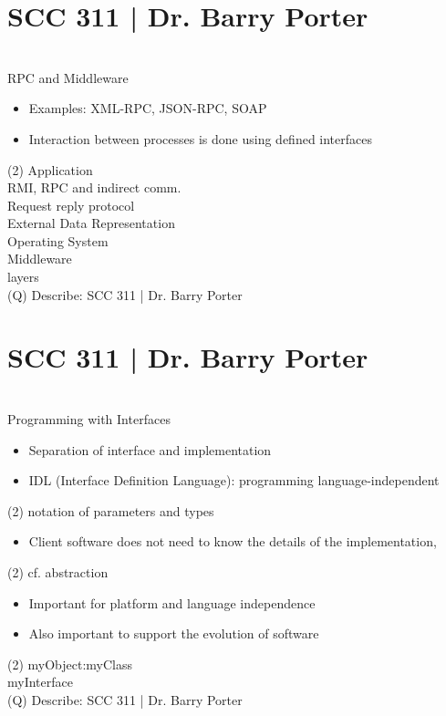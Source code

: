 \documentclass[12pt]{article}
\begin{document}
\section{SCC 311 | Dr. Barry Porter}
\\
RPC and Middleware\\
\begin{itemize}
  \item Examples: XML-RPC, JSON-RPC, SOAP
  \item Interaction between processes is done using defined interfaces
\end{itemize}(2)
Application\\
RMI, RPC and indirect comm.\\
Request reply protocol\\
External Data Representation\\
Operating System\\
Middleware \\
layers\\
\clearpage
(Q)
Describe: SCC 311 | Dr. Barry Porter
\clearpage
\section{SCC 311 | Dr. Barry Porter}
\\
Programming with Interfaces\\
\begin{itemize}
  \item Separation of interface and implementation
  \item IDL (Interface Definition Language): programming language-independent 
\end{itemize}(2)
notation of parameters and types\\
\begin{itemize}
  \item Client software does not need to know the details of the implementation, 
\end{itemize}(2)
cf. abstraction\\
\begin{itemize}
  \item Important for platform and language independence
  \item Also important to support the evolution of software
\end{itemize}(2)
myObject:myClass\\
myInterface\\
\clearpage
(Q)
Describe: SCC 311 | Dr. Barry Porter
\clearpage
\end{document}
